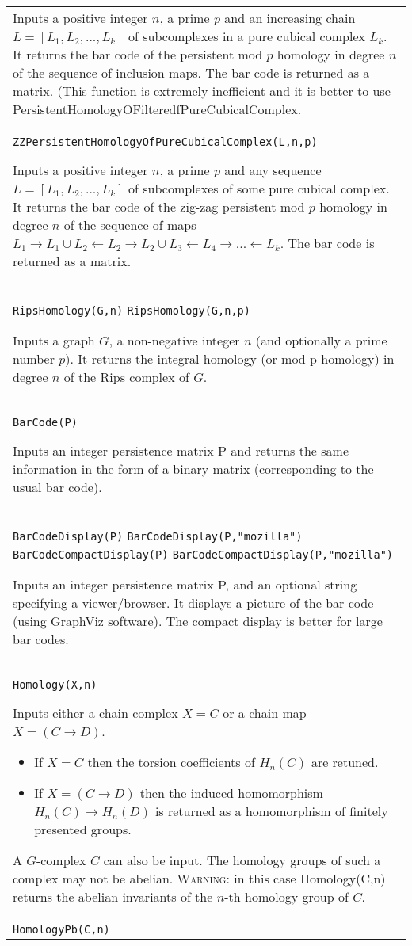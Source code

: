 \documentclass[a4paper,11pt]{report}
\begin{document}
{\begin{center}
\begin{tabular}{|l|}
 Inputs a positive integer $n$, a prime $p$ and an increasing chain $L=[L_1, L_2, ..., L_k]$ of subcomplexes in a pure cubical complex $L_k$. It returns the bar code of the persistent mod $p$ homology in degree $n$ of the sequence of inclusion maps. The bar code is returned as a matrix. (This
function is extremely inefficient and it is better to use
PersistentHomologyOFilteredfPureCubicalComplex. 

 \\
 \index{ZZPersistentHomologyOfPureCubicalComplex} \texttt{ZZPersistentHomologyOfPureCubicalComplex(L,n,p)} 

 Inputs a positive integer $n$, a prime $p$ and any sequence $L=[L_1, L_2, ..., L_k]$ of subcomplexes of some pure cubical complex. It returns the bar code of the
zig-zag persistent mod $p$ homology in degree $n$ of the sequence of maps $L_1 \rightarrow L_1 \cup L_2 \leftarrow L_2 \rightarrow L_2 \cup L_3
\leftarrow L_4 \rightarrow ... \leftarrow L_k$. The bar code is returned as a matrix. 

 \\
 \index{RipsHomology} \texttt{RipsHomology(G,n)} \texttt{RipsHomology(G,n,p)} 

 Inputs a graph $G$, a non-negative integer $n$ (and optionally a prime number $p$). It returns the integral homology (or mod p homology) in degree $n$ of the Rips complex of $G$. \\
 \index{BarCode} \texttt{BarCode(P)} 

 Inputs an integer persistence matrix P and returns the same information in the
form of a binary matrix (corresponding to the usual bar code). \\
 \index{BarCodeDisplay} \index{BarCodeCompactDisplay} \texttt{BarCodeDisplay(P)} \texttt{BarCodeDisplay(P,"mozilla")} \texttt{BarCodeCompactDisplay(P)} \texttt{BarCodeCompactDisplay(P,"mozilla")} 

 Inputs an integer persistence matrix P, and an optional string specifying a
viewer/browser. It displays a picture of the bar code (using GraphViz
software). The compact display is better for large bar codes. \\
 \index{Homology} \texttt{Homology(X,n)} 

 Inputs either a chain complex $X=C$ or a chain map $X=(C \longrightarrow D)$. 
\begin{itemize}
\item If $X=C$ then the torsion coefficients of $H_n(C)$ are retuned.
\item  If $X=(C \longrightarrow D)$ then the induced homomorphism $H_n(C) \longrightarrow H_n(D)$ is returned as a homomorphism of finitely presented groups. 
\end{itemize}
 A $G$-complex $C$ can also be input. The homology groups of such a complex may not be abelian. \textsc{Warning:} in this case Homology(C,n) returns the abelian invariants of the $n$-th homology group of $C$. \\
 \index{HomologyPb} \texttt{HomologyPb(C,n)} 


\end{tabular}
\end{center}}
\end{document}
